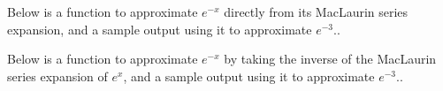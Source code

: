 \documentclass[11pt]{article}
\begin{document}
\renewcommand{\thesubsection}{\thesection.\alph{subsection}}
\section{} %
\subsection{} %



\subsection{} %



\subsection{} %



\subsection{} %



\section{} %
\subsection{} %



\subsection{} %



\subsection{} %



\section{} %
Below is a function to approximate $e^{-x}$ directly from its MacLaurin series
expansion, and a sample output using it to approximate $e^{-3}$..


Below is a function to approximate $e^{-x}$ by taking the inverse of the MacLaurin
series expansion of $e^x$, and a sample output using it to approximate $e^{-3}$..


\end{document}
